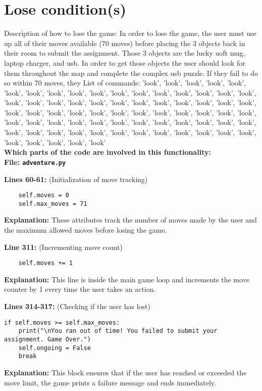 \documentclass[11pt]{article}
\begin{document}
\section*{Lose condition(s)}
Description of how to lose the game:
In order to lose the game, the user must use up all of their moves available (70 moves) before placing the 3 objects
back in their room to submit the assignment. Those 3 objects are the lucky uoft mug, laptop charger, and usb. In order
to get those objects the user should look for them throughout the map and complete the complex usb puzzle. If they fail
to do so within 70 moves, they
List of commands:
'look', 'look', 'look', 'look', 'look', 'look', 'look', 'look', 'look', 'look', 'look', 'look', 'look', 'look', 'look',
'look', 'look', 'look', 'look', 'look', 'look', 'look', 'look', 'look', 'look', 'look', 'look', 'look', 'look', 'look',
'look', 'look', 'look', 'look', 'look', 'look', 'look', 'look', 'look', 'look', 'look', 'look', 'look', 'look', 'look',
'look', 'look', 'look', 'look', 'look', 'look', 'look', 'look', 'look', 'look', 'look', 'look', 'look', 'look', 'look',
'look', 'look', 'look', 'look', 'look', 'look', 'look', 'look', 'look', 'look' \\
\textbf{Which parts of the code are involved in this functionality:} \\

\textbf{File: \texttt{adventure.py}}

\noindent\textbf{Lines 60-61:} (Initialization of move tracking)
\begin{verbatim}
    self.moves = 0
    self.max_moves = 71
\end{verbatim}
\textbf{Explanation:} These attributes track the number of moves made by the user and the maximum allowed moves before
losing the game.

\noindent\textbf{Line 311:} (Incrementing move count)
\begin{verbatim}
    self.moves += 1
\end{verbatim}
\textbf{Explanation:} This line is inside the main game loop and increments the move counter by 1 every time the user
takes an action.

\noindent\textbf{Lines 314-317:} (Checking if the user has lost)
\begin{verbatim}
if self.moves >= self.max_moves:
    print("\nYou ran out of time! You failed to submit your assignment. Game Over.")
    self.ongoing = False
    break
\end{verbatim}
\textbf{Explanation:} This block ensures that if the user has reached or exceeded the move limit, the game prints a
failure message and ends immediately.
\end{document}
